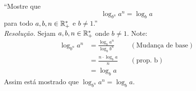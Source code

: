 \enquote{Mostre que
\begin{displaymath}
    \log_{b^n} a^n = \log_b a
\end{displaymath}
para todo $a, b, n \in \mathbb R_+^*$ e $b \ne 1$.} \\
\emph{Resolução.}
Sejam $a, b, n \in \mathbb R_+^*$ onde $b \ne 1$. Note:
\begin{align*}
    \log_{b^n} a^n & = \frac{\log_b a^n}{\log_b b^n} \quad &(\text{Mudança de base}) \\ & = 
    \frac{n \cdot \log_b a}{n} \quad &(\text{prop. b}) \\ & = 
    \log_b a
\end{align*}
Assim está mostrado que $\log_{b^n} a^n = \log_b a$.